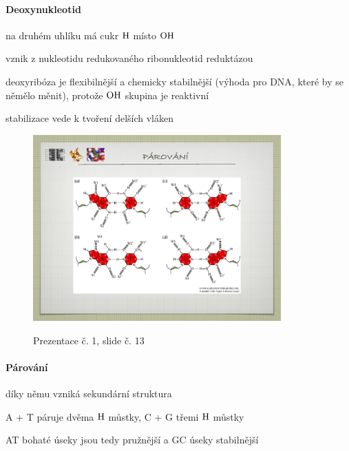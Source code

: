 \documentclass[DIV=8]{scrreprt}
\begin{document}
\paragraph{Deoxynukleotid}
\begin{myItemize}[nosep]
    \item na druhém uhlíku má cukr \(\ce{H}\) místo \(\ce{OH}\)
    \item vznik z nukleotidu redukovaného ribonukleotid reduktázou
    \item deoxyribóza je flexibilnější a chemicky stabilnější (výhoda pro DNA, které by se němělo měnit), protože \(\ce{OH}\) skupina je reaktivní
    \item stabilizace vede k tvoření delších vláken
\end{myItemize}



\begin{figure}
    \caption{Prezentace č. 1, slide č. 13}
    \includegraphics[width=0.85\textwidth]{slides-1/slide-13.jpg}
    \centering
    \label{slides-1-slide-13}
\end{figure}

\paragraph{Párování}
\begin{myItemize}[nosep]
    \item díky němu vzniká sekundární struktura
    \item A + T páruje dvěma \(\ce{H}\) můstky, C + G třemi \(\ce{H}\) můstky
    \item AT bohaté úseky jsou tedy pružnější a GC úseky stabilnější
\end{myItemize}
\end{document}
